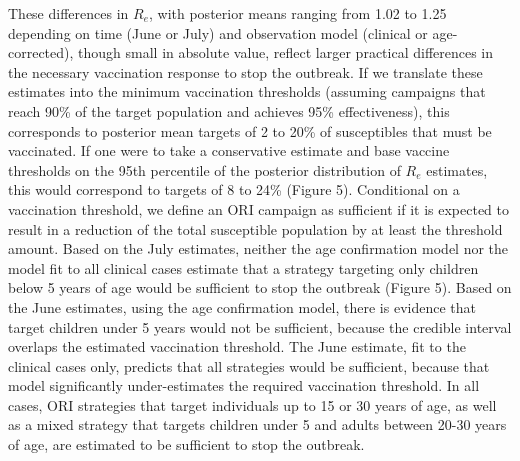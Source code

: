 These differences in $R_e$, with posterior means ranging from 1.02 to 1.25 depending on time (June or July) and observation model (clinical or age-corrected), though small in absolute value, reflect larger practical differences in the necessary vaccination response to stop the outbreak. If we translate these estimates into the minimum vaccination thresholds (assuming campaigns that reach 90\% of the target population and achieves 95\% effectiveness), this corresponds to posterior mean targets of 2 to 20\% of susceptibles that must be vaccinated. If one were to take a conservative estimate and base vaccine thresholds on the 95th percentile of the posterior distribution of $R_e$ estimates, this would correspond to targets of
8 to 24\% (Figure 5). Conditional on a vaccination threshold, we define an ORI campaign as sufficient if it is expected to result in a reduction of
the total susceptible population by at least the threshold amount. Based on the July estimates, neither the age confirmation model nor the model fit
to all clinical cases estimate that a strategy targeting only children below 5 years of age would be sufficient to stop the outbreak
(Figure 5). Based on the June estimates, using the age confirmation model, there is evidence that target children under 5 years would not be
sufficient, because the credible interval overlaps the estimated vaccination threshold. The June estimate, fit to the clinical cases only, predicts
that all strategies would be sufficient, because that model significantly under-estimates the required vaccination threshold. In all cases, ORI strategies that target individuals up to 15 or 30 years of age, as well as a mixed strategy that targets children under 5 and adults between 20-30 years of age, are estimated to be sufficient to stop the outbreak.